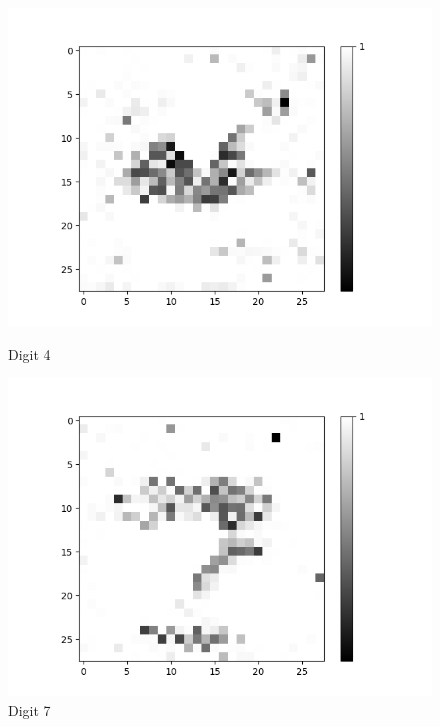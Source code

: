 \begin{figure}[H]
\begin{minipage}[b]{0.19\textwidth}
		\includegraphics[width=\textwidth]{AND-OLD(LSM)/Layer0-Neuron-4.png}
		\caption{Digit 4}
	\end{minipage}
	\begin{minipage}[b]{0.19\textwidth}
		\captionsetup{labelformat=empty}
		\includegraphics[width=\textwidth]{AND-OLD(LSM)/Layer0-Neuron-7.png}
		\caption{Digit 7}
	\end{minipage}
	\begin{minipage}[b]{0.19\textwidth}
		\captionsetup{labelformat=empty}

\end{minipage}
\end{figure}
